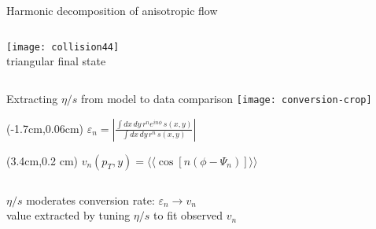 \documentclass[svgnames]{beamer}
\begin{document}
\begin{frame}[t,noframenumbering]{Harmonic decomposition of anisotropic flow}
\begin{columns}
 \begin{column}{0.3\textwidth}
  \centering
  \texttt{[image: collision44]} \\
  \footnotesize triangular final state
 \end{column}
 
 \begin{column}{0.05\textwidth}
 \end{column}
\end{columns}

\end{frame}

\begin{frame}{Extracting $\eta/s$ from model to data comparison}
\vspace{0.15 in}
\centering \texttt{[image: conversion-crop]}

 \begin{textblock*}{\linewidth}(-1.7cm,0.06cm)
  \centering
  \small
  $\varepsilon_n = \left |\frac{\int dx \, dy\, r^n e^{i n \phi} \, s(x,y)}{\int dx \, dy \, r^n \, s(x,y)} \right|$
\end{textblock*}

\begin{textblock*}{\linewidth}(3.4cm,0.2 cm)
  \centering
  \small
  $v_n(p_T,y)  = \langle \langle \cos[n(\phi-\Psi_n)] \rangle \rangle$
\end{textblock*}
\vspace{0.1 in}
\begin{columns}
 \begin{column}{0.75\textwidth}
  \begin{block}{\vspace*{-3ex}}
    \centering
    $\eta/s$ moderates conversion rate: $\varepsilon_n \rightarrow v_n$ \\ 
    \vspace{0.05 in}
    value extracted by tuning $\eta/s$ to fit observed $v_n$
  \end{block}
 \end{column}
\end{columns}

\end{frame}
\end{document}
